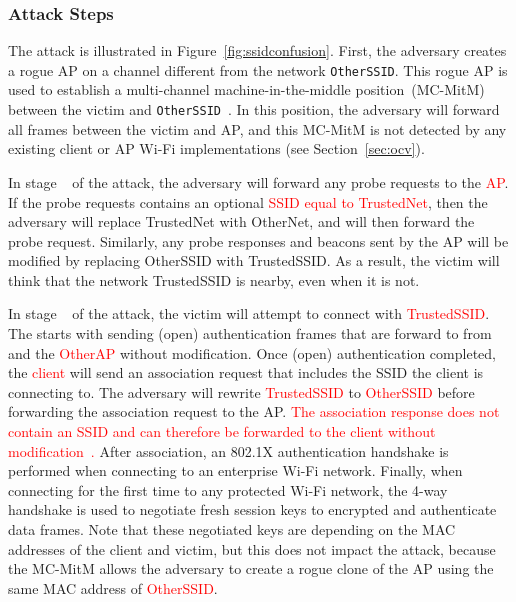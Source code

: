 \documentclass[sigconf,review]{acmart}
\newcommand{\circlenum}[1]{\textcircled{\raisebox{-0.90pt}{#1}}}
\newcommand{\wifi}{\mbox{Wi-Fi}}
\newcommand{\fourway}{\mbox{4-way}}
\DeclareRobustCommand{\red}[1]{\textcolor{red}{#1}}
\begin{document}
\subsubsection{Attack Steps}

The attack is illustrated in Figure~\ref{fig:ssidconfusion}.
First, the adversary creates a rogue AP on a channel different from the network \verb|OtherSSID|.
This rogue AP is used to establish a multi-channel machine-in-the-middle position~(MC-MitM) between the victim and \verb|OtherSSID|~\cite{vanhoef2018operating,thankappan2022multi}.
In this position, the adversary will forward all frames between the victim and AP, and this MC-MitM is not detected by any existing client or AP \wifi{} implementations (see Section~\ref{sec:ocv}).



In stage~\circlenum{1} of the attack, the adversary will forward any probe requests to the \red{AP}.
If the probe requests contains an optional \red{SSID equal to TrustedNet}, then the adversary will replace TrustedNet with OtherNet, and will then forward the probe request.
Similarly, any probe responses and beacons sent by the AP will be modified by replacing OtherSSID with TrustedSSID.
As a result, the victim will think that the network TrustedSSID is nearby, even when it is not.

In stage~\circlenum{2} of the attack, the victim will attempt to connect with \red{TrustedSSID}.
The starts with sending (open) authentication frames that are forward to from and the \red{OtherAP} without modification.
Once (open) authentication completed, the \red{client} will send an association request that includes the SSID the client is connecting to.
The adversary will rewrite \red{TrustedSSID} to \red{OtherSSID} before forwarding the association request to the AP.
\red{The association response does not contain an SSID and can therefore be forwarded to the client without modification~\cite[Table~9-35]{ieee80211-2020}.}
After association, an 802.1X authentication handshake is performed when connecting to an enterprise \wifi{} network.
Finally, when connecting for the first time to any protected \wifi{} network, the \fourway{} handshake is used to negotiate fresh session keys to encrypted and authenticate data frames.
Note that these negotiated keys are depending on the MAC addresses of the client and victim, but this does not impact the attack, because the MC-MitM allows the adversary to create a rogue clone of the AP using the same MAC address of \red{OtherSSID}.
\end{document}
